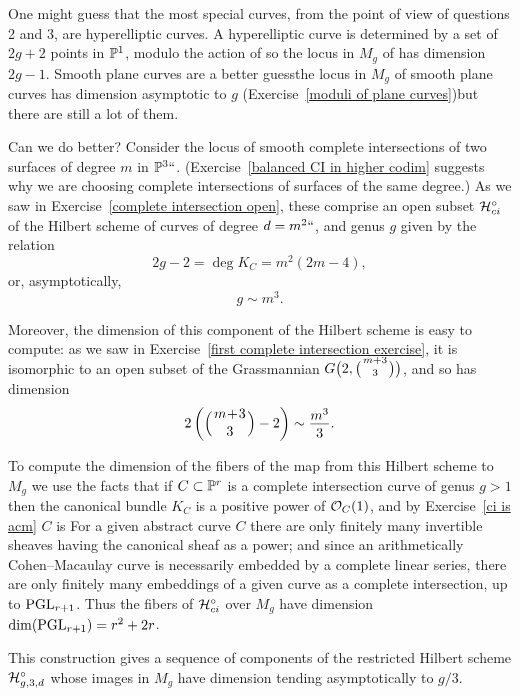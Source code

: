 One might guess that the most special curves, from the point of view of
questions 2 and 3, are hyperelliptic curves. A hyperelliptic curve is
determined by a set of $2g+2$ points in $\mathbb P^{1}$, modulo the action of
%
so the locus in $M_g$ of 
%
 has dimension
$2g-1$. Smooth plane curves are a better guess\emdash  the locus in $M_g$ of
smooth plane curves has dimension asymptotic to $g$ (Exercise~\ref{moduli
of plane curves})\emdash but there are still a lot of them.

Can we do better?  Consider the locus of smooth complete intersections
of two surfaces of degree $m$ in $\mathbb P^3` `$.
(Exercise~\ref{balanced CI in higher codim}
suggests why we are choosing complete
intersections of surfaces of the same degree.) As we saw in
Exercise~\ref{complete intersection open}, these comprise an open
subset $\mathcal H^\circ_{ci}$ of the Hilbert scheme of curves of degree $d =
m^2` `$, and genus $g$ given by the relation
$$
2g-2 = \deg K_C = m^2(2m-4),
$$
or, asymptotically,
$$
g \sim m^3.
$$

Moreover, the dimension of this component of the Hilbert scheme is
easy to compute: as we saw in Exercise~\ref{first complete intersection
exercise},  it is isomorphic to an open subset of the Grassmannian
$G\bigl(2, \tbinom{m+3}{3}\bigr)$, and so has dimension
$$
2\left(\mbinom{m+3}{3} - 2\right) \; \sim \; \frac{m^3}{3}.
$$

To compute the dimension of the fibers of the map from this Hilbert
scheme to $M_{g}$ we use
the facts that if $C \subset \mathbb P^r$ is a complete intersection curve
of genus $g >1$ then the canonical bundle $K_C$ is a positive power
of ${\mathcal O}_C(1)$, and by Exercise~\ref{ci is acm}  $C$ is
%
For a given abstract curve $C$ there are only finitely many invertible
sheaves having the canonical sheaf as a power; and since an arithmetically
Cohen--Macaulay curve is necessarily embedded by a complete linear series,
there are only finitely many embeddings of a given curve as a complete
intersection, up to $\operatorname{PGL}_{r+1}$. Thus the fibers of $\mathcal H^\circ_{ci}$
over $M_g$ have dimension $\dim(\operatorname{PGL}_{r+1}) = r^2 + 2r$.

This construction gives 
a sequence of components of the restricted
Hilbert scheme $\mathcal H^\circ_{g,3,d}$ whose images in $M_g$ have dimension
tending asymptotically to $g/3$.

